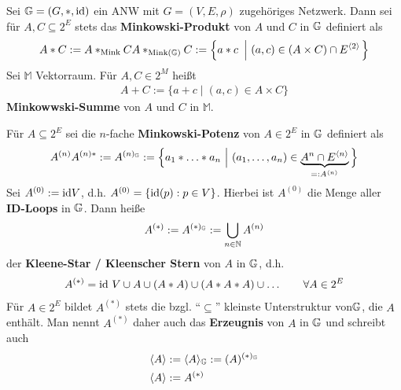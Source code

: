 
\begin{proposition}\enter
Sei $\mathbb{G}=(G,\ast,\text{id})$ ein ANW mit $G=(V,E,\rho)$ zugehöriges Netzwerk. Dann sei für $A,C\subseteq 2^E$ stets das \textbf{Minkowski-Produkt} von $A$ und $C$ in $\mathbb{G}$ definiert als
\begin{align*}
A\ast C
:=A\ast_{\text{Mink}} C
A\ast_{\text{Mink}(\mathbb{G})} C
:=\left\lbrace a\ast c~\left|~(a,c)\in (A\times C)\cap E^{\langle2\rangle}\right.\right\rbrace
\end{align*}
Sei $\mathbb{M}$ Vektorraum. Für $A,C\in 2^M$ heißt
\begin{align*}
A+C:=\big\lbrace a+c\mid (a,c)\in A\times C\big\rbrace
\end{align*}
\textbf{Minkowwski-Summe} von $A$ und $C$ in $\mathbb{M}$.

Für $A\subseteq 2^E$ sei die $n$-fache \textbf{Minkowski-Potenz} von $A\in 2^E$ in $\mathbb{G}$ definiert als
\begin{align*}
A^{(n)}
A^{(n)\ast}
:=A^{(n)_{\mathbb{G}}}
:=\Big\lbrace a_1\ast\ldots\ast a_n~\Big|~(a_1,\ldots,a_n)\in \underbrace{A^n\cap E^{\langle n\rangle}}_{=:A^{\langle n\rangle}}\Big\rbrace
\end{align*}
Sei $A^{(0)}:=\text{id} V$, d.h. $A^{(0)}=\lbrace\text{id}(p):p\in V\rbrace$. Hierbei ist $A^{(0)}$ die Menge aller \textbf{ID-Loops} in $\mathbb{G}$.
Dann heiße
\begin{align*}
A^{(\ast)}:=A^{(\ast)_{\mathbb{G}}}:=\bigcup\limits_{n\in\mathbb{N}} A^{(n)}
\end{align*}
der \textbf{Kleene-Star / Kleenscher Stern} von $A$ in $\mathbb{G}$, d.h.
\begin{align*}
A^{(\ast)}=\text{id}~V\cup A\cup (A\ast A)\cup (A\ast A\ast A)\cup\ldots\qquad\forall A\in 2^E
\end{align*}
Für $A\in 2^E$ bildet $A^{(\ast)}$ stets die bzgl. ``$\subseteq$'' kleinste Unterstruktur von$\mathbb{G}$, die $A$ enthält. Man nennt $A^{(\ast)}$ daher auch das \textbf{Erzeugnis} von $A$ in $\mathbb{G}$ und schreibt auch
\begin{align*}
\langle A\rangle &:=\langle A\rangle_{\mathbb{G}}:=(A)^{(\ast)_{\mathbb{G}}}\\
\langle A\rangle&:=A^{(\ast)}
\end{align*}
\end{proposition}

